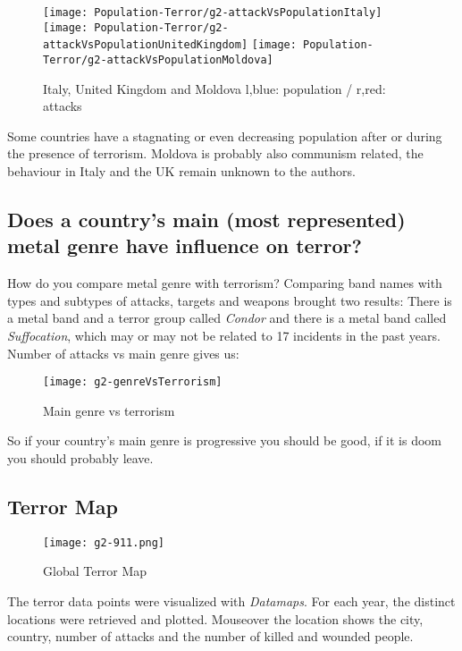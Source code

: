 \begin{figure}[hbt!]
	\texttt{[image: Population-Terror/g2-attackVsPopulationItaly]}
	\centering
	\texttt{[image: Population-Terror/g2-attackVsPopulationUnitedKingdom]}
	\texttt{[image: Population-Terror/g2-attackVsPopulationMoldova]}
	\caption{Italy, United Kingdom and Moldova l,blue: population / r,red: attacks}
\end{figure}

Some countries have a stagnating or even decreasing population after or during the presence of terrorism. Moldova is probably also communism related, the behaviour in Italy and the UK remain unknown to the authors.

\newpage

\subsection{Does a country's main (most represented) metal genre have influence on terror?}
How do you compare metal genre with terrorism? Comparing band names with types and subtypes of attacks, targets and weapons brought two results: There is a metal band and a terror group called \emph{Condor} and there is a metal band called \emph{Suffocation}, which may or may not be related to 17 incidents in the past years. Number of attacks vs main genre gives us:



\begin{figure}[hbt!]
	\centering
	\texttt{[image: g2-genreVsTerrorism]}
	\caption{Main genre vs terrorism}
\end{figure}

So if your country's main genre is progressive you should be good, if it is doom you should probably leave.

\newpage

\subsection{Terror Map}

\begin{figure}[hbt!]
	\centering
	\texttt{[image: g2-911.png]}
	\caption{Global Terror Map}
\end{figure}

The terror data points were visualized with \emph{Datamaps}. For each year, the distinct locations were retrieved and plotted. Mouseover the location shows the city, country, number of attacks and the number of killed and wounded people.